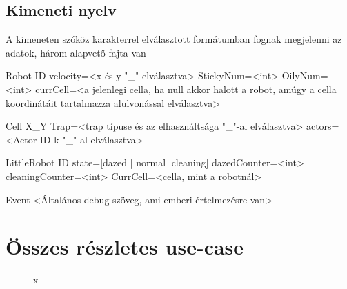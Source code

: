 \subsection{Kimeneti nyelv}
A kimeneten szóköz karakterrel elválasztott formátumban fognak megjelenni az adatok, három alapvető fajta van

Robot ID velocity=<x és y "\_" elválasztva> StickyNum=<int> OilyNum=<int> currCell=<a jelenlegi cella, ha null akkor halott a robot, amúgy a cella koordinátáit tartalmazza alulvonással elválasztva>

Cell X\_Y Trap=<trap típuse és az elhasználtsága "\_"-al elválasztva> actors=<Actor ID-k "\_"-al elválasztva>

LittleRobot ID state=[dazed | normal |cleaning] dazedCounter=<int> cleaningCounter=<int> CurrCell=<cella, mint a robotnál>

Event <Általános debug szöveg, ami emberi értelmezésre van>

\section{Összes részletes use-case}

\begin{figure}[h]
\begin{center}
\caption{x}
\label{fig:ProtoUseCase}
\end{center}
\end{figure}

